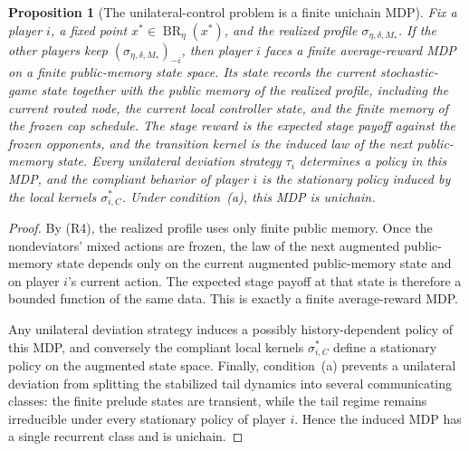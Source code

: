 \documentclass[12pt]{article}
\newtheorem{proposition}[theorem]{Proposition}
\theoremstyle{definition}
\newcommand{\1}{\mathbf{1}}
\DeclareMathOperator{\BR}{BR}
\begin{document}
\begin{proposition}[The unilateral-control problem is a finite unichain MDP]
\label{prop:induced-routed-mdp}
Fix a player $i$, a fixed point $x^*\in\BR_\eta(x^*)$, and the realized profile
$\sigma_{\eta,\delta,M_*}$. If the other players keep
$(\sigma_{\eta,\delta,M_*})_{-i}$, then player $i$ faces a finite average-reward
MDP on a finite public-memory state space. Its state records the current
stochastic-game state together with the public memory of the realized profile,
including the current routed node, the current local controller state, and the
finite memory of the frozen cap schedule. The stage reward is the expected stage
payoff against the frozen opponents, and the transition kernel is the induced law
of the next public-memory state. Every unilateral deviation strategy $\tau_i$
determines a policy in this MDP, and the compliant behavior of player $i$ is the
stationary policy induced by the local kernels $\sigma_{i,C}^*$. Under
condition~\textnormal{(a)}, this MDP is unichain.
\end{proposition}

\begin{proof}
By \textnormal{(R4)}, the realized profile uses only
finite public memory. Once the nondeviators' mixed actions are frozen, the law of
the next augmented public-memory state depends only on the current augmented
public-memory state and on player $i$'s current action. The expected stage payoff
at that state is therefore a bounded function of the same data. This is exactly a
finite average-reward MDP.

Any unilateral deviation strategy induces a possibly history-dependent policy of
this MDP, and conversely the compliant local kernels $\sigma_{i,C}^*$ define a
stationary policy on the augmented state space. Finally, condition~\textnormal{(a)}
prevents a unilateral deviation from splitting the stabilized tail dynamics into
several communicating classes: the finite prelude states are transient, while the
tail regime remains irreducible under every stationary policy of player $i$.
Hence the induced MDP has a single recurrent class and is unichain.
\end{proof}
\end{document}
